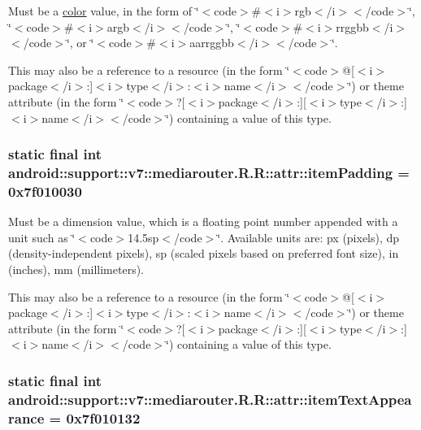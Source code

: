 Must be a \hyperlink{classandroid_1_1support_1_1v7_1_1mediarouter_1_1_r_1_1color}{color} value, in the form of \char`\"{}$<$code$>$\#$<$i$>$rgb$<$/i$>$$<$/code$>$\char`\"{}, \char`\"{}$<$code$>$\#$<$i$>$argb$<$/i$>$$<$/code$>$\char`\"{}, \char`\"{}$<$code$>$\#$<$i$>$rrggbb$<$/i$>$$<$/code$>$\char`\"{}, or \char`\"{}$<$code$>$\#$<$i$>$aarrggbb$<$/i$>$$<$/code$>$\char`\"{}. 

This may also be a reference to a resource (in the form \char`\"{}$<$code$>$@\mbox{[}$<$i$>$package$<$/i$>$:\mbox{]}$<$i$>$type$<$/i$>$:$<$i$>$name$<$/i$>$$<$/code$>$\char`\"{}) or theme attribute (in the form \char`\"{}$<$code$>$?\mbox{[}$<$i$>$package$<$/i$>$:\mbox{]}\mbox{[}$<$i$>$type$<$/i$>$:\mbox{]}$<$i$>$name$<$/i$>$$<$/code$>$\char`\"{}) containing a value of this type. \hypertarget{classandroid_1_1support_1_1v7_1_1mediarouter_1_1_r_1_1attr_c5533ef2b1bf3b130d6d168c720a39f4}{
\subsubsection[{itemPadding}]{\setlength{\rightskip}{0pt plus 5cm}static final int android::support::v7::mediarouter.R.R::attr::itemPadding = 0x7f010030}}
\label{classandroid_1_1support_1_1v7_1_1mediarouter_1_1_r_1_1attr_c5533ef2b1bf3b130d6d168c720a39f4}


Must be a dimension value, which is a floating point number appended with a unit such as \char`\"{}$<$code$>$14.5sp$<$/code$>$\char`\"{}. Available units are: px (pixels), dp (density-independent pixels), sp (scaled pixels based on preferred font size), in (inches), mm (millimeters). 

This may also be a reference to a resource (in the form \char`\"{}$<$code$>$@\mbox{[}$<$i$>$package$<$/i$>$:\mbox{]}$<$i$>$type$<$/i$>$:$<$i$>$name$<$/i$>$$<$/code$>$\char`\"{}) or theme attribute (in the form \char`\"{}$<$code$>$?\mbox{[}$<$i$>$package$<$/i$>$:\mbox{]}\mbox{[}$<$i$>$type$<$/i$>$:\mbox{]}$<$i$>$name$<$/i$>$$<$/code$>$\char`\"{}) containing a value of this type. \hypertarget{classandroid_1_1support_1_1v7_1_1mediarouter_1_1_r_1_1attr_747757ae4579474c4020cc14d41c1356}{
\subsubsection[{itemTextAppearance}]{\setlength{\rightskip}{0pt plus 5cm}static final int android::support::v7::mediarouter.R.R::attr::itemTextAppearance = 0x7f010132}}
\label{classandroid_1_1support_1_1v7_1_1mediarouter_1_1_r_1_1attr_747757ae4579474c4020cc14d41c1356}


